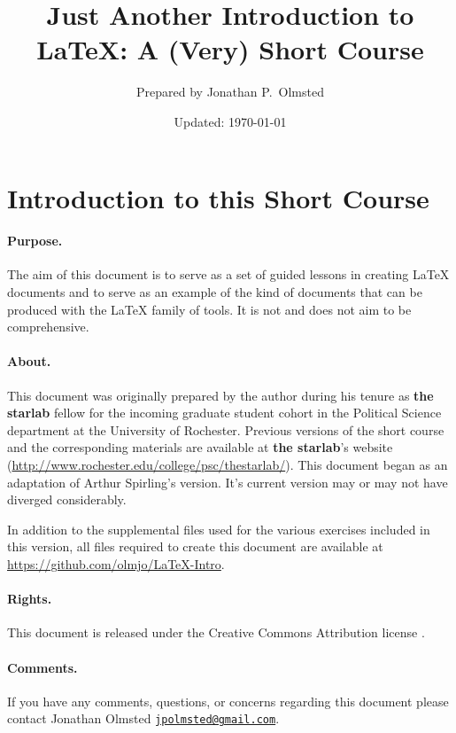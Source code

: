 \documentclass[10pt,letterpaper]{article}
\author{Prepared by Jonathan P.\ Olmsted}
\title{Just Another Introduction to \LaTeX{}: A (Very) Short Course}
\date{Updated: \today}
\newcommand{\tsl}{\textbf{\textsf{the starlab}}}
\begin{document}
\begin{titlepage}
  \maketitle
\end{titlepage}

\section*{Introduction to this Short Course}

\paragraph{Purpose.} The aim of this document is to serve as a set of guided
lessons in creating \LaTeX{} documents and to serve as an example of the kind of
documents that can be produced with the \LaTeX{} family of tools. It is not and
does not aim to be comprehensive.

\paragraph{About.} This document was originally prepared by the author during
his tenure as \tsl{} fellow for the incoming graduate student cohort in the
Political Science department at the University of Rochester. Previous versions
of the short course and the corresponding materials are available at \tsl{}'s
website (\url{http://www.rochester.edu/college/psc/thestarlab/}). This document
began as an adaptation of Arthur Spirling's version. It's current version may or
may not have diverged considerably.

In addition to the supplemental files used for the various exercises included in
this version, all files required to create this document are available at
\url{https://github.com/olmjo/LaTeX-Intro}.

\paragraph{Rights.}This document is released under the Creative
Commons Attribution license \by{}.

\paragraph{Comments.}If you have any comments, questions, or concerns regarding
this document please contact Jonathan Olmsted
\href{mailto:jpolmsted@gmail.com}{\texttt{jpolmsted@gmail.com}}.
\end{document}
